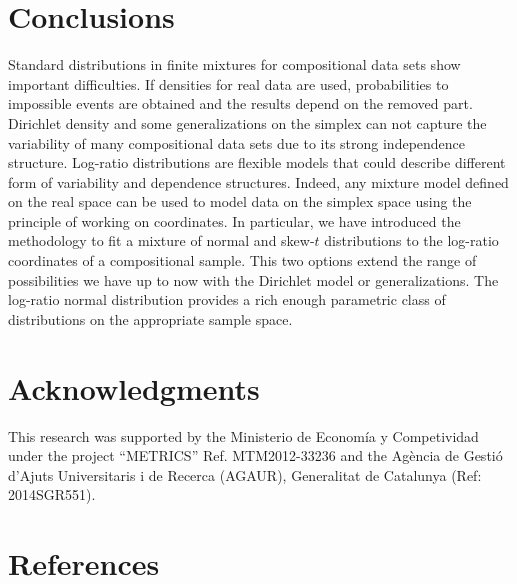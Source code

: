 \documentclass[preprint, review, 3p, authoryear]{elsarticle}
\begin{document}
\section{Conclusions}
\label{conclusion_section}
Standard distributions in finite mixtures for compositional data sets show important difficulties. If densities for real data are used, probabilities to impossible events are obtained and the results depend on the removed part. Dirichlet density and some generalizations on the simplex can not capture the variability of many compositional data sets due to its strong independence structure. Log-ratio distributions are flexible models that could describe different form of variability and dependence structures. Indeed, any mixture model defined on the real space can be used to model data on the simplex space using the principle of working on coordinates. In particular, we have introduced the methodology to fit a mixture of normal and skew-$t$ distributions to the log-ratio coordinates of a compositional sample. This two options extend the range of possibilities we have up to now with the Dirichlet model or generalizations. The log-ratio normal distribution provides a rich enough parametric class of distributions on the appropriate sample space. 

\section*{Acknowledgments}
This research was supported by the Ministerio de Econom\'ia y Competividad under the project
``METRICS'' Ref. MTM2012-33236 and the Agència de Gestió d'Ajuts Universitaris i de Recerca (AGAUR), Generalitat de Catalunya (Ref: 2014SGR551).

\section*{References}
\end{document}
